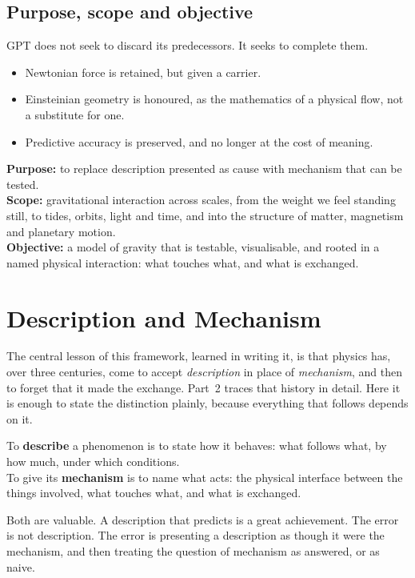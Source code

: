 \subsection*{Purpose, scope and objective}

GPT does not seek to discard its predecessors. It seeks to complete them.
\begin{itemize}
  \item Newtonian force is retained, but given a carrier.
  \item Einsteinian geometry is honoured, as the mathematics of a physical flow, not a substitute for one.
  \item Predictive accuracy is preserved, and no longer at the cost of meaning.
\end{itemize}

\textbf{Purpose:} to replace description presented as cause with mechanism that can be tested.\\
\textbf{Scope:} gravitational interaction across scales, from the weight we feel standing still, to tides, orbits, light and time, and into the structure of matter, magnetism and planetary motion.\\
\textbf{Objective:} a model of gravity that is testable, visualisable, and rooted in a named physical interaction: what touches what, and what is exchanged.

\section{Description and Mechanism}

The central lesson of this framework, learned in writing it, is that physics has, over three centuries, come to accept \emph{description} in place of \emph{mechanism}, and then to forget that it made the exchange. Part~2 traces that history in detail. Here it is enough to state the distinction plainly, because everything that follows depends on it.

To \textbf{describe} a phenomenon is to state how it behaves: what follows what, by how much, under which conditions.\\
To give its \textbf{mechanism} is to name what acts: the physical interface between the things involved, what touches what, and what is exchanged.

Both are valuable. A description that predicts is a great achievement. The error is not description. The error is presenting a description as though it were the mechanism, and then treating the question of mechanism as answered, or as naive.

